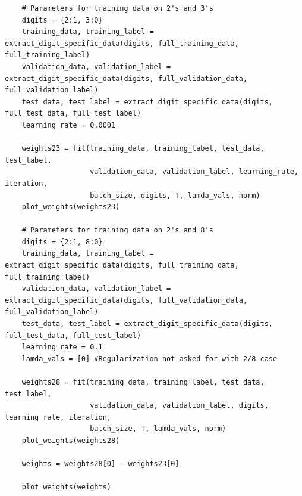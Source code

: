 \documentclass{article}
\begin{document}
\begin{lstlisting}
    # Parameters for training data on 2's and 3's
    digits = {2:1, 3:0}
    training_data, training_label = extract_digit_specific_data(digits, full_training_data, full_training_label)
    validation_data, validation_label = extract_digit_specific_data(digits, full_validation_data, full_validation_label)
    test_data, test_label = extract_digit_specific_data(digits, full_test_data, full_test_label)
    learning_rate = 0.0001 
    
    weights23 = fit(training_data, training_label, test_data, test_label, 
                    validation_data, validation_label, learning_rate, iteration, 
                    batch_size, digits, T, lamda_vals, norm)
    plot_weights(weights23)

    # Parameters for training data on 2's and 8's
    digits = {2:1, 8:0}
    training_data, training_label = extract_digit_specific_data(digits, full_training_data, full_training_label)
    validation_data, validation_label = extract_digit_specific_data(digits, full_validation_data, full_validation_label)
    test_data, test_label = extract_digit_specific_data(digits, full_test_data, full_test_label)
    learning_rate = 0.1 
    lamda_vals = [0] #Regularization not asked for with 2/8 case

    weights28 = fit(training_data, training_label, test_data, test_label, 
                    validation_data, validation_label, digits, learning_rate, iteration, 
                    batch_size, T, lamda_vals, norm)
    plot_weights(weights28)
    
    weights = weights28[0] - weights23[0]

    plot_weights(weights)
    
\end{lstlisting}
\end{document}
